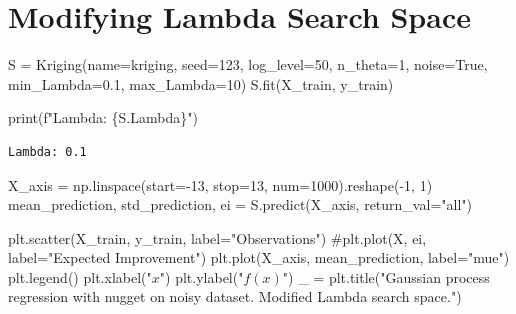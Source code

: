 \documentclass[
  letterpaper,
  DIV=11,
  numbers=noendperiod]{scrreprt}
\newenvironment{Shaded}{\begin{snugshade}}{\end{snugshade}}
\newcommand{\BuiltInTok}[1]{\textcolor[rgb]{0.00,0.23,0.31}{#1}}
\newcommand{\CommentTok}[1]{\textcolor[rgb]{0.37,0.37,0.37}{#1}}
\newcommand{\DecValTok}[1]{\textcolor[rgb]{0.68,0.00,0.00}{#1}}
\newcommand{\FloatTok}[1]{\textcolor[rgb]{0.68,0.00,0.00}{#1}}
\newcommand{\NormalTok}[1]{\textcolor[rgb]{0.00,0.23,0.31}{#1}}
\newcommand{\OperatorTok}[1]{\textcolor[rgb]{0.37,0.37,0.37}{#1}}
\newcommand{\SpecialCharTok}[1]{\textcolor[rgb]{0.37,0.37,0.37}{#1}}
\newcommand{\SpecialStringTok}[1]{\textcolor[rgb]{0.13,0.47,0.30}{#1}}
\newcommand{\StringTok}[1]{\textcolor[rgb]{0.13,0.47,0.30}{#1}}
\newcommand{\VariableTok}[1]{\textcolor[rgb]{0.07,0.07,0.07}{#1}}
\begin{document}
\section{Modifying Lambda Search
Space}\label{modifying-lambda-search-space}

\begin{Shaded}
\begin{Highlighting}[]
\NormalTok{S }\OperatorTok{=}\NormalTok{ Kriging(name}\OperatorTok{=}\StringTok{\textquotesingle{}kriging\textquotesingle{}}\NormalTok{,}
\NormalTok{            seed}\OperatorTok{=}\DecValTok{123}\NormalTok{,}
\NormalTok{            log\_level}\OperatorTok{=}\DecValTok{50}\NormalTok{,}
\NormalTok{            n\_theta}\OperatorTok{=}\DecValTok{1}\NormalTok{,}
\NormalTok{            noise}\OperatorTok{=}\VariableTok{True}\NormalTok{,}
\NormalTok{            min\_Lambda}\OperatorTok{=}\FloatTok{0.1}\NormalTok{,}
\NormalTok{            max\_Lambda}\OperatorTok{=}\DecValTok{10}\NormalTok{)}
\NormalTok{S.fit(X\_train, y\_train)}

\BuiltInTok{print}\NormalTok{(}\SpecialStringTok{f"Lambda: }\SpecialCharTok{\{}\NormalTok{S}\SpecialCharTok{.}\NormalTok{Lambda}\SpecialCharTok{\}}\SpecialStringTok{"}\NormalTok{)}
\end{Highlighting}
\end{Shaded}

\begin{verbatim}
Lambda: 0.1
\end{verbatim}

\begin{Shaded}
\begin{Highlighting}[]
\NormalTok{X\_axis }\OperatorTok{=}\NormalTok{ np.linspace(start}\OperatorTok{={-}}\DecValTok{13}\NormalTok{, stop}\OperatorTok{=}\DecValTok{13}\NormalTok{, num}\OperatorTok{=}\DecValTok{1000}\NormalTok{).reshape(}\OperatorTok{{-}}\DecValTok{1}\NormalTok{, }\DecValTok{1}\NormalTok{)}
\NormalTok{mean\_prediction, std\_prediction, ei }\OperatorTok{=}\NormalTok{ S.predict(X\_axis, return\_val}\OperatorTok{=}\StringTok{"all"}\NormalTok{)}

\NormalTok{plt.scatter(X\_train, y\_train, label}\OperatorTok{=}\StringTok{"Observations"}\NormalTok{)}
\CommentTok{\#plt.plot(X, ei, label="Expected Improvement")}
\NormalTok{plt.plot(X\_axis, mean\_prediction, label}\OperatorTok{=}\StringTok{"mue"}\NormalTok{)}
\NormalTok{plt.legend()}
\NormalTok{plt.xlabel(}\StringTok{"$x$"}\NormalTok{)}
\NormalTok{plt.ylabel(}\StringTok{"$f(x)$"}\NormalTok{)}
\NormalTok{\_ }\OperatorTok{=}\NormalTok{ plt.title(}\StringTok{"Gaussian process regression with nugget on noisy dataset. Modified Lambda search space."}\NormalTok{)}
\end{Highlighting}
\end{Shaded}
\end{document}
